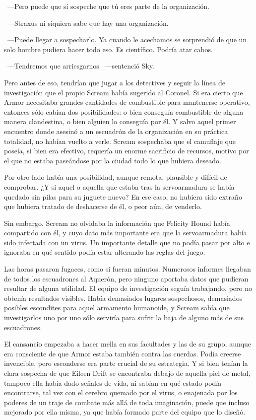 ~---Pero puede que sí sospeche que tú eres parte de la organización.

~---Straxus ni siquiera sabe que hay una organización.

~---Puede llegar a sospecharlo. Ya cuando le acechamos se sorprendió de que un solo hombre pudiera hacer todo eso. Es científico. Podría atar cabos.

~---Tendremos que arriesgarnos ~---sentenció Sky.

Pero antes de eso, tendrían que jugar a los detectives y seguir la línea de investigación que el propio Scream había sugerido al Coronel. Si era cierto que Armor necesitaba grandes cantidades de combustible para mantenerse operativo, entonces sólo cabían dos posibilidades: o bien conseguía combustible de alguna manera clandestina, o bien alguien lo conseguía por él. Y salvo aquel primer encuentro donde asesinó a un escuadrón de la organización en su práctica totalidad, no habían vuelto a verle. Scream sospechaba que el camuflaje que poseía, si bien era efectivo, requería un enorme sacrificio de recursos, motivo por el que no estaba paseándose por la ciudad todo lo que hubiera deseado.

Por otro lado había una posibilidad, aunque remota, plausible y difícil de comprobar. ¿Y si aquel o aquella que estaba tras la servoarmadura se había quedado sin pilas para su juguete nuevo? En ese caso, no hubiera sido extraño que hubiera tratado de deshacerse de él, o peor aún, de venderlo.

Sin embargo, Scream no olvidaba la información que Felicity Hound había compartido con él, y cuyo dato más importante era que la servoarmadura había sido infectada con un virus. Un importante detalle que no podía pasar por alto e ignoraba en qué sentido podía estar alterando las reglas del juego.

Las horas pasaron fugaces, como si fueran minutos. Numerosos informes llegaban de todos los escuadrones al Aquerón, pero ninguno aportaba datos que pudieran resultar de alguna utilidad. El equipo de investigación seguía trabajando, pero no obtenía resultados visibles. Había demasiados lugares sospechosos, demasiados posibles escondites para aquel armamento humanoide, y Scream sabía que investigarlos uno por uno sólo serviría para sufrir la baja de alguno más de sus escuadrones.

El cansancio empezaba a hacer mella en sus facultades y las de su grupo, aunque era consciente de que Armor estaba también contra las cuerdas. Podía creerse invencible, pero esconderse era parte crucial de su estrategia. Y si bien tenían la clara sospecha de que Eileen Drift se encontraba debajo de aquella piel de metal, tampoco ella había dado señales de vida, ni sabían en qué estado podía encontrarse, tal vez con el cerebro quemado por el virus, o enajenada por los poderes de un traje de combate más allá de toda imaginación, puede que incluso mejorado por ella misma, ya que había formado parte del equipo que lo diseñó.

